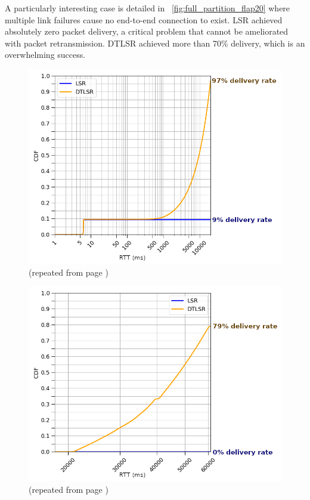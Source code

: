 \documentclass[withindex,glossary,openany]{cam-thesis}
\newcommand{\repeatcaption}[2]{%
  \renewcommand{\thefigure}{\ref{#1}}%
  \captionsetup{list=no}%
  \caption{#2 (repeated from page \pageref{#1})}%
  \addtocounter{figure}{-1}%
}
\begin{document}
A particularly interesting case is detailed in ~\ref{fig:full_partition_flap20} where multiple link failures cause no end-to-end connection to exist. LSR achieved absolutely zero packet delivery, a critical problem that cannot be ameliorated with packet retransmission. DTLSR achieved more than 70\% delivery, which is an overwhelming success.

\begin{minipage}{1\textwidth}

\begin{figure}[H]
  \centering
  \hspace*{2.4cm}
  \includegraphics[width=0.8\linewidth]{delay_partition_flap2_20}
  \repeatcaption{fig:partition_2_20}{}
\end{figure}

\begin{figure}[H]
  \centering
  \hspace*{2.4cm}
  \includegraphics[width=0.8\linewidth]{delay_full_partition_flap20}
  \repeatcaption{fig:full_partition_flap20}{}
\end{figure}



\end{minipage}
\end{document}
